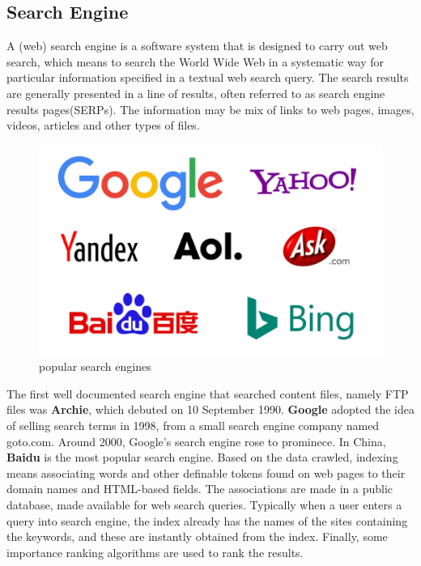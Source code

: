 \documentclass[10pt,times,twocolumn]{article}
\begin{document}
\subsection{Search Engine}
A (web) search engine is a software system that is designed to carry out web search, which means to search the World Wide Web in a systematic 
way for particular information specified in a textual web search query. The search results are generally presented in a line of 
results, often referred to as search engine results pages(SERPs). The information may be mix of links to 
web pages, images, videos, articles and other types of files.
\begin{figure}[ht]
\centering
\includegraphics[scale=0.45]{fig/2.png}
\caption{popular search engines}
\label{fig:label}
\end{figure}
\newline
The first well documented search engine that searched content files, namely FTP files was \textbf{Archie}, which debuted on 10 September 1990. 
\textbf{Google} adopted the idea of selling search terms in 1998, from a small search engine company named goto.com. Around 2000, Google's search engine 
rose to prominece. In China, \textbf{Baidu} is the most popular search engine.
\newline
Based on the data crawled, indexing means associating words and other definable tokens found on web pages to their domain names and HTML-based 
fields. The associations are made in a public database, made available for web search queries. Typically when a user enters a query into search engine, 
the index already has the names of the sites containing the keywords, and these are 
instantly obtained from the index. Finally, some importance ranking algorithms are used to 
rank the results.
\end{document}
